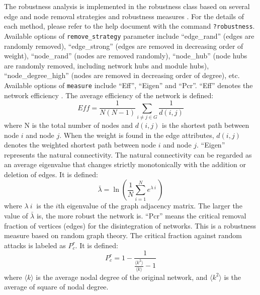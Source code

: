 \documentclass[
]{book}
\newenvironment{Shaded}{\begin{snugshade}}{\end{snugshade}}
\newcommand{\AttributeTok}[1]{\textcolor[rgb]{0.13,0.29,0.53}{#1}}
\newcommand{\DecValTok}[1]{\textcolor[rgb]{0.00,0.00,0.81}{#1}}
\newcommand{\FloatTok}[1]{\textcolor[rgb]{0.00,0.00,0.81}{#1}}
\newcommand{\FunctionTok}[1]{\textcolor[rgb]{0.13,0.29,0.53}{\textbf{#1}}}
\newcommand{\NormalTok}[1]{#1}
\newcommand{\OtherTok}[1]{\textcolor[rgb]{0.56,0.35,0.01}{#1}}
\newcommand{\SpecialCharTok}[1]{\textcolor[rgb]{0.81,0.36,0.00}{\textbf{#1}}}
\newcommand{\StringTok}[1]{\textcolor[rgb]{0.31,0.60,0.02}{#1}}
\begin{document}
The robustness analysis is implemented in the robustness class based on
several edge and node removal strategies and robustness measures \citep{Bellingeri_comprem_2020, LiuJing_comprobust_2017}.
For the details of each method, please refer to the help document with the command \texttt{?robustness}.
Available options of \texttt{remove\_strategy} parameter include ``edge\_rand'' (edges are randomly removed),
``edge\_strong'' (edges are removed in decreasing order of weight), ``node\_rand'' (nodes are removed randomly),
``node\_hub'' (node hubs are randomly removed, including network hubs and module hubs),
``node\_degree\_high'' (nodes are removed in decreasing order of degree), etc.
Available options of \texttt{measure} include ``Eff'', ``Eigen'' and ``Pcr''.
``Eff'' denotes the network efficiency \citep{LiuJing_comprobust_2017}.
The average efficiency of the network is defined:
\[ Eff = \frac{1}{N(N - 1)} \sum_{i \neq j \in G}\frac{1}{d(i, j)} \]
where N is the total number of nodes and \(d(i,j)\) is the shortest path between node \(i\) and node \(j\).
When the weight is found in the edge attributes, \(d(i,j)\) denotes the weighted shortest path between node \(i\) and node \(j\).
``Eigen'' represents the natural connectivity.
The natural connectivity can be regarded as an average eigenvalue that changes strictly monotonically with the addition or deletion of edges.
It is defined:
\[ \bar{\lambda} = \ln(\frac{1}{N} \sum_{i=1}^{N} e^{\lambda~i~}) \]
where \(\lambda~i~\) is the \(i\)th eigenvalue of the graph adjacency matrix. The larger the value of \(\bar{\lambda}\) is, the more robust the network is.
``Pcr'' means the critical removal fraction of vertices (edges) for the disintegration of networks.
This is a robustness measure based on random graph theory.
The critical fraction against random attacks is labeled as \(P_{c}^r\). It is defined:
\[ P_{c}^r = 1 - \frac{1}{\frac{\langle k^2 \rangle}{\langle k \rangle} - 1} \]
where \(\langle k \rangle\) is the average nodal degree of the original network, and \(\langle k^2 \rangle\) is the average of square of nodal degree.

\begin{Shaded}
\end{Shaded}
\end{document}
